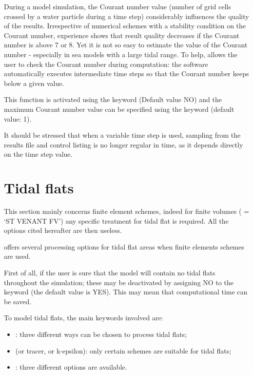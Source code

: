  During a model simulation, the Courant number value (number of grid cells crossed by a water particle during a time step) considerably influences the quality of the results. Irrespective of numerical schemes with a stability condition on the Courant number, experience shows that result quality decreases if the Courant number is above 7 or 8. Yet it is not so easy to estimate the value of the Courant number - especially in sea models with a large tidal range. To help,  allows the user to check the Courant number during computation: the software automatically executes intermediate time steps so that the Courant number keeps below a given value.

 This function is activated using the keyword  (Default value NO) and the maximum Courant number value can be specified using the keyword  (default value: 1).

 It should be stressed that when a variable time step is used, sampling from the results file and control listing is no longer regular in time, as it depends directly on the time step value.


\section{ Tidal flats}
This section mainly concerns finite element schemes, indeed for finite volumes ( = `ST VENANT FV') any specific treatment for tidal flat is required.
All the options cited hereafter are then useless. 

 offers several processing options for tidal flat areas when finite elements schemes are used. 

 First of all, if the user is sure that the model will contain no tidal flats throughout the simulation; these may be deactivated by assigning NO to the keyword  (the default value is YES). This may mean that computational time can be saved.

To model tidal flats, the main keywords involved are:
\begin{itemize}
\item {}: three different ways can be chosen to process tidal flats;
\item {} (or tracer, or k-epsilon): only certain schemes are suitable for tidal flats;
\item {}: three different options are available.
\end{itemize}

